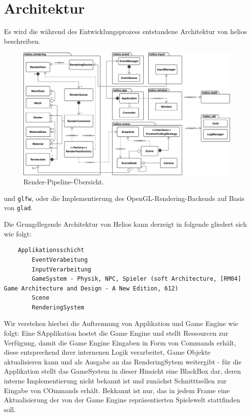 \section{Architektur}
Es wird die während des Entwicklungsprozess entstandene Architektur von helios beschreiben.


\begin{figure}[t]
    \centering
    \includegraphics[width=1\textwidth]{img/package_diagram.svg}%
    \caption{Render-Pipeline-Übersicht.}
    \label{fig:pipeline}
\end{figure}



und  \texttt{glfw}, oder die Implementierung des OpenGL-Rendering-Backends auf Basis von \texttt{glad}.

Die Grungdlegende Architektur von Helios kann derzeigt in folgende gliedert sich wie folgt:

\begin{verbatim}
    Applikationsschicht
        EventVerabeitung
        InputVerarbeitung
        GameSystem - Physik, NPC, Spieler (soft Architecture, [RM04] Game Architecture and Design - A New Edition, 612)
        Scene
        RenderingSystem
\end{verbatim}

Wir verstehen hierbei die Auftrennung von Applikation und Game Engine wie folgt: Eine SApplikation hostet die Game Engine und stellt Ressourcen zur Verfügung, damit die Game Engine Eingaben in Form von Commands erhält, diese entsprechend ihrer internenen Logik verarbeitet, Game Objekte aktualisieren kann und als Ausgabe an das RenderingSytem weitergibt - für die Applikation stellt das GameSystem in dieser Hinsicht eine BlackBox dar, deren interne Implementierung nicht bekannt ist und zunächst Schnitttsellen zur Eingabe von COmmands erhält. Bekkannt ist nur, das in jedem Frame eine Aktualisierung der von der Game Engine repräsentierten Spielewelt stattfinden soll.

